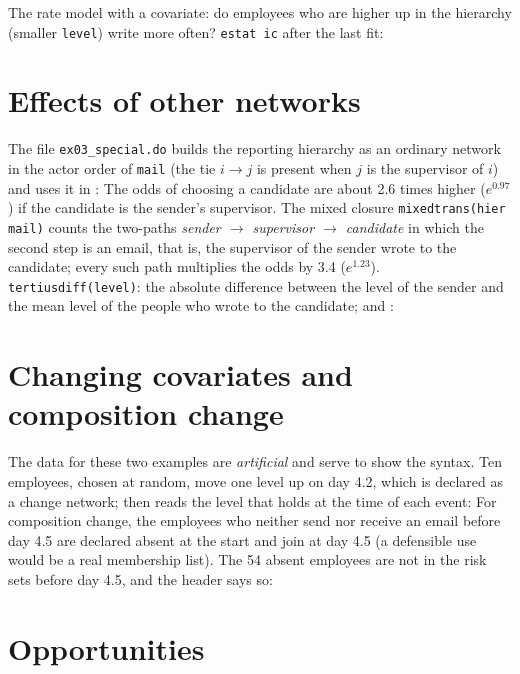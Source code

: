 The rate model with a covariate: do employees who are higher up in the hierarchy (smaller \texttt{level}) write more often?
\texttt{estat ic} after the last fit:

\section{Effects of other networks}\label{sec:ex_netterms}

The file \texttt{ex03\_special.do} builds the reporting hierarchy as an ordinary network in the actor order of \texttt{mail} (the tie $i\to j$ is present when $j$ is the supervisor of $i$) and uses it in :
The odds of choosing a candidate are about 2.6 times higher ($e^{0.97}$) if the candidate is the sender's supervisor. The mixed closure \texttt{mixedtrans(hier mail)} counts the two-paths \emph{sender $\to$ supervisor $\to$ candidate} in which the second step is an email, that is, the supervisor of the sender wrote to the candidate; every such path multiplies the odds by 3.4 ($e^{1.23}$).
\texttt{tertiusdiff(level)}: the absolute difference between the level of the sender and the mean level of the people who wrote to the candidate; and :

\section{Changing covariates and composition change}\label{sec:ex_special}

The data for these two examples are \emph{artificial} and serve to show the syntax. Ten employees, chosen at random, move one level up on day 4.2, which is declared as a change network;  then reads the level that holds at the time of each event:
For composition change, the employees who neither send nor receive an email before day 4.5 are declared absent at the start and join at day 4.5 (a defensible use would be a real membership list). The 54 absent employees are not in the risk sets before day 4.5, and the header says so:

\section{Opportunities}\label{sec:ex_opp}

